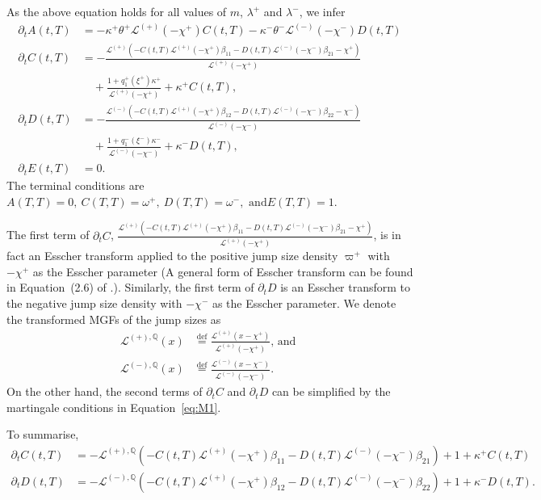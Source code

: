 \documentclass[11pt,a4paper]{article}
\numberwithin{equation}{section}
\theoremstyle{remark}
\theoremstyle{definition}
\begin{document}
As the above equation holds for all values of $m$, $\lambda^+$ and $\lambda^-$, we infer
\begin{align*}
    \partial_t A(t,T) &= -\kappa^+\theta^+\mathcal{L}^{(+)}(-\chi^+)C(t,T) - \kappa^-\theta^-\mathcal{L}^{(-)}(-\chi^-)D(t,T)\\
    \partial_t C(t,T) &= -\frac{\mathcal{L}^{(+)}(-C(t,T)\mathcal{L}^{(+)}(-\chi^+)\beta_{11} - D(t,T)\mathcal{L}^{(-)}(-\chi^-)\beta_{21}-\chi^+)}{\mathcal{L}^{(+)}(-\chi^+)}\\
    &\quad +\frac{1+q^+_1(\xi^+)\kappa^+}{\mathcal{L}^{(+)}(-\chi^+)}+\kappa^+C(t,T),\\
    \partial_t D(t,T) &= -\frac{\mathcal{L}^{(-)}(-C(t,T)\mathcal{L}^{(+)}(-\chi^+)\beta_{12} - D(t,T)\mathcal{L}^{(-)}(-\chi^-)\beta_{22}-\chi^-)}{\mathcal{L}^{(-)}(-\chi^-)}\\
    &\quad +\frac{1+q^-_1(\xi^-)\kappa^-}{\mathcal{L}^{(-)}(-\chi^-)}+\kappa^-D(t,T),\\
    \partial_t E(t,T) &= 0.
\end{align*}
The terminal conditions are $A(T,T)=0,\ C(T,T)=\omega^+,\ D(T,T)=\omega^-,\text{ and} E(T,T)=1$.

The first term of $\partial_t C$, $\frac{\mathcal{L}^{(+)}(-C(t,T)\mathcal{L}^{(+)}(-\chi^+)\beta_{11} - D(t,T)\mathcal{L}^{(-)}(-\chi^-)\beta_{21}-\chi^+)}{\mathcal{L}^{(+)}(-\chi^+)}$, is in fact an Esscher transform applied to the positive jump size density $\varpi^+$ with $-\chi^+$ as the Esscher parameter (A general form of Esscher transform can be found in Equation~(2.6) of \cite{gerber1995option}.).
Similarly, the first term of $\partial_t D$ is an Esscher transform to the negative jump size density with $-\chi^-$ as the Esscher parameter.
We denote the transformed MGFs of the jump sizes as
\begin{align*}
    \mathcal{L}^{(+), \mathbb{Q}}(x) &\overset{\text{def}} = \frac{\mathcal{L}^{(+)}(x-\chi^+)}{\mathcal{L}^{(+)}(-\chi^+)} \text{, and }\\
    \mathcal{L}^{(-), \mathbb{Q}}(x) &\overset{\text{def}} = \frac{\mathcal{L}^{(-)}(x-\chi^-)}{\mathcal{L}^{(-)}(-\chi^-)}.
\end{align*}
On the other hand, the second terms of $\partial_t C$ and $\partial_t D$ can be simplified by the martingale conditions in Equation~\eqref{eq:M1}.

To summarise,
\begin{align*}
    \partial_t C(t,T) &= -\mathcal{L}^{(+),\mathbb{Q}}\left(-C(t,T)\mathcal{L}^{(+)}(-\chi^+)\beta_{11}-D(t,T)\mathcal{L}^{(-)}(-\chi^-)\beta_{21}\right)+1+\kappa^+C(t,T)\\
    \partial_t D(t,T) &= -\mathcal{L}^{(-),\mathbb{Q}}\left(-C(t,T)\mathcal{L}^{(+)}(-\chi^+)\beta_{12}-D(t,T)\mathcal{L}^{(-)}(-\chi^-)\beta_{22}\right)+1+\kappa^-D(t,T).
\end{align*}
\end{document}
